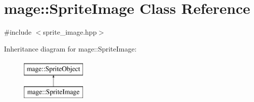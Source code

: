 \hypertarget{classmage_1_1_sprite_image}{}\section{mage\+:\+:Sprite\+Image Class Reference}
\label{classmage_1_1_sprite_image}


{\ttfamily \#include $<$sprite\+\_\+image.\+hpp$>$}

Inheritance diagram for mage\+:\+:Sprite\+Image\+:\begin{figure}[H]
\begin{center}
\leavevmode
\includegraphics[height=2.000000cm]{classmage_1_1_sprite_image}
\end{center}
\end{figure}
